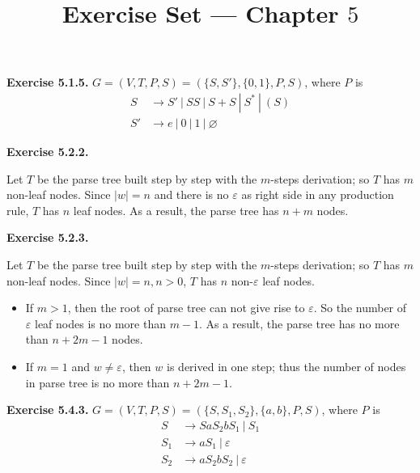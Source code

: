 \documentclass[a4paper]{article}
\title{Exercise Set --- Chapter $5$}
\date{}
\newenvironment{exercise}[1]{
	\par
	\noindent\textbf{Exercise #1.}\quad
}{
	\par
	\bigskip
}
\newcommand{\dv}{\ |\ }
\begin{document}
\maketitle

\begin{exercise}{5.1.5} $G=(V,T,P,S)=(\{S,S'\},\{0,1\},P,S)$, where $P$ is
\begin{align*}
     S &\to S'\dv SS\dv S+S\dv S^*\dv (S)\\
     S' &\to e\dv 0\dv 1 \dv \varnothing
\end{align*}
\end{exercise}

\begin{exercise}{5.2.2}
    Let $T$ be the parse tree built step by step with the $m$-steps derivation;
    so $T$ has $m$ non-leaf nodes.
    Since $|w|=n$ and there is no $\varepsilon$ as right side in any production rule,
    $T$ has $n$ leaf nodes.
    As a result, the parse tree has $n+m$ nodes.
\end{exercise}

\begin{exercise}{5.2.3}
    Let $T$ be the parse tree built step by step with the $m$-steps derivation;
    so $T$ has $m$ non-leaf nodes.
    Since $|w|=n,n>0$, $T$ has $n$ non-$\varepsilon$ leaf nodes.
    \begin{itemize}
        \item If $m>1$, then the root of parse tree can not give rise to $\varepsilon$.
            So the number of $\varepsilon$ leaf nodes is no more than $m-1$.
            As a result, the parse tree has no more than $n+2m-1$ nodes.
        \item If $m=1$ and $w\neq\varepsilon$, then $w$ is derived in one step; thus
            the number of nodes in parse tree is no more than $n+2m-1$.
    \end{itemize}
\end{exercise}

\begin{exercise}{5.4.3} $G=(V,T,P,S)=(\{S,S_1,S_2\},\{a,b\},P,S)$, where $P$ is
\begin{align*}
    S &\to SaS_2bS_1\dv S_1\\
    S_1 &\to aS_1\dv \varepsilon\\
    S_2 &\to aS_2bS_2\dv \varepsilon\\
\end{align*}
\end{exercise}
\end{document}
